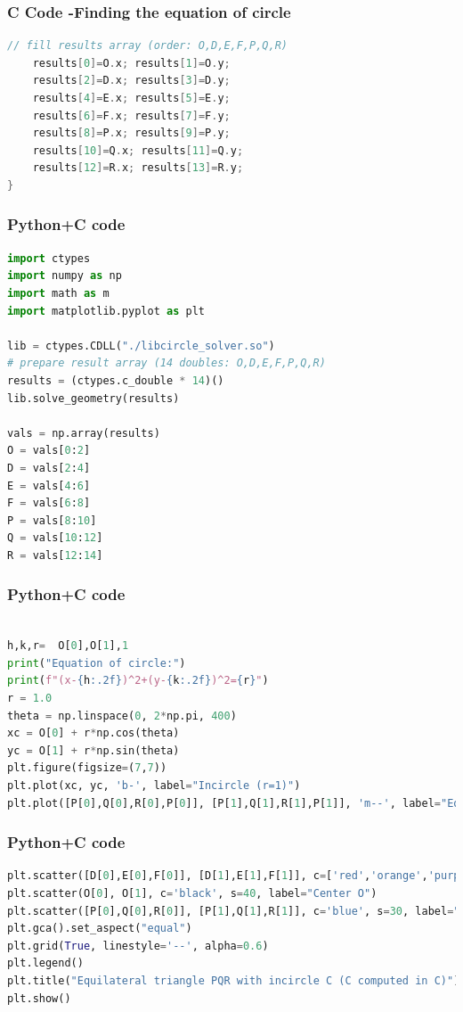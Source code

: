 \documentclass{beamer}
\begin{document}
\begin{frame}[fragile]
    \frametitle{C Code -Finding the equation of circle}

    \begin{lstlisting}[language=C]
    // fill results array (order: O,D,E,F,P,Q,R)
    results[0]=O.x; results[1]=O.y;
    results[2]=D.x; results[3]=D.y;
    results[4]=E.x; results[5]=E.y;
    results[6]=F.x; results[7]=F.y;
    results[8]=P.x; results[9]=P.y;
    results[10]=Q.x; results[11]=Q.y;
    results[12]=R.x; results[13]=R.y;
}

    \end{lstlisting}
\end{frame}


\begin{frame}[fragile]
    \frametitle{Python+C code}

    \begin{lstlisting}[language=Python]
import ctypes
import numpy as np
import math as m
import matplotlib.pyplot as plt

lib = ctypes.CDLL("./libcircle_solver.so")
# prepare result array (14 doubles: O,D,E,F,P,Q,R)
results = (ctypes.c_double * 14)()
lib.solve_geometry(results)

vals = np.array(results)
O = vals[0:2]
D = vals[2:4]
E = vals[4:6]
F = vals[6:8]
P = vals[8:10]
Q = vals[10:12]
R = vals[12:14]

    \end{lstlisting}
\end{frame}

\begin{frame}[fragile]
    \frametitle{Python+C code}

    \begin{lstlisting}[language=Python]

h,k,r=  O[0],O[1],1
print("Equation of circle:")
print(f"(x-{h:.2f})^2+(y-{k:.2f})^2={r}")
r = 1.0
theta = np.linspace(0, 2*np.pi, 400)
xc = O[0] + r*np.cos(theta)
yc = O[1] + r*np.sin(theta)
plt.figure(figsize=(7,7))
plt.plot(xc, yc, 'b-', label="Incircle (r=1)")
plt.plot([P[0],Q[0],R[0],P[0]], [P[1],Q[1],R[1],P[1]], 'm--', label="Equilateral Triangle")
    \end{lstlisting}
\end{frame}

\begin{frame}[fragile]
    \frametitle{Python+C code}
    \begin{lstlisting}[language=Python]
plt.scatter([D[0],E[0],F[0]], [D[1],E[1],F[1]], c=['red','orange','purple'], label="Tangency D,E,F")
plt.scatter(O[0], O[1], c='black', s=40, label="Center O")
plt.scatter([P[0],Q[0],R[0]], [P[1],Q[1],R[1]], c='blue', s=30, label="Vertices P,Q,R")
plt.gca().set_aspect("equal")
plt.grid(True, linestyle='--', alpha=0.6)
plt.legend()
plt.title("Equilateral triangle PQR with incircle C (C computed in C)")
plt.show()
    \end{lstlisting}   
\end{frame}
\end{document}
